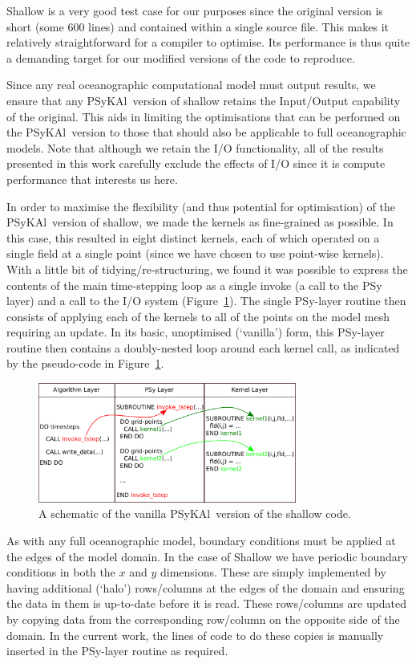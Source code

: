 \documentclass[journal]{IEEEtran}
\newcommand{\psykal}{{PS}y{KA}l\ }
\begin{document}
Shallow is a very good test case for our purposes since the original
version is short (some 600 lines) and contained within a single source
file. This makes it relatively straightforward for a compiler to
optimise. Its performance is thus quite a demanding target for our
modified versions of the code to reproduce.

Since any real oceanographic computational model must output results,
we ensure that any \psykal version of shallow retains the Input/Output
capability of the original. This aids in limiting the optimisations
that can be performed on the \psykal version to those that should also
be applicable to full oceanographic models. Note that although we
retain the I/O functionality, all of the results presented in this work
carefully exclude the effects of I/O since it is compute performance
that interests us here.

In order to maximise the flexibility (and thus potential for
optimisation) of the \psykal version of shallow, we made the kernels
as fine-grained as possible. In this case, this resulted in eight
distinct kernels, each of which operated on a single field at a single
point (since we have chosen to use point-wise kernels). With a little
bit of tidying/re-structuring, we found it was possible to express the
contents of the main time-stepping loop as a single invoke (a call to
the PSy layer) and a call to the I/O system
(Figure~\ref{FIG_psykal_shallow_structure}). The single PSy-layer
routine then consists of applying each of the kernels to all of the
points on the model mesh requiring an update. In its basic,
unoptimised (`vanilla') form, this PSy-layer routine then contains a
doubly-nested loop around each kernel call, as indicated by the
pseudo-code in Figure~\ref{FIG_psykal_shallow_structure}.

\begin{figure}
\centering
\includegraphics[width=85mm]{psykal_shallow}
\caption{A schematic of the vanilla \psykal version of the shallow code.}
\label{FIG_psykal_shallow_structure}
\end{figure}

As with any full oceanographic model, boundary conditions must be
applied at the edges of the model domain. In the case of Shallow we
have periodic boundary conditions in both the $x$ and $y$ dimensions.
These are simply implemented by having additional (`halo')
rows/columns at the edges of the domain and ensuring the data in them
is up-to-date before it is read. These rows/columns are updated by
copying data from the corresponding row/column on the opposite side of
the domain. In the current work, the lines of code to do these copies
is manually inserted in the PSy-layer routine as required.
\end{document}
